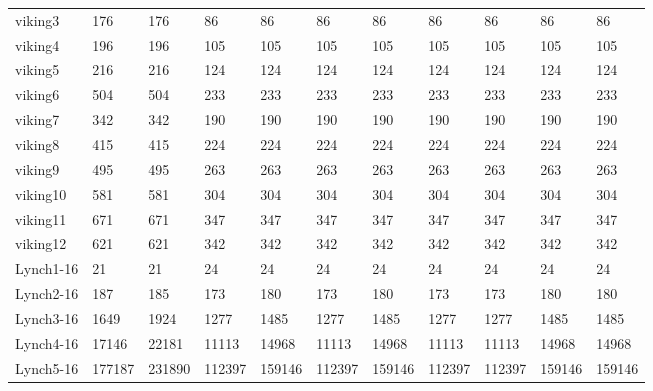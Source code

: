 \begin{table}
\begin{adjustbox}{max totalheight=\textheight}
\begin{tabular}{|l|llllllllll|}
    viking3            & 176      & 176      & 86       & 86       & 86       & 86       & 86       & 86       & 86       & 86       \\
    viking4            & 196      & 196      & 105      & 105      & 105      & 105      & 105      & 105      & 105      & 105      \\
    viking5            & 216      & 216      & 124      & 124      & 124      & 124      & 124      & 124      & 124      & 124      \\
    viking6            & 504      & 504      & 233      & 233      & 233      & 233      & 233      & 233      & 233      & 233      \\
    viking7            & 342      & 342      & 190      & 190      & 190      & 190      & 190      & 190      & 190      & 190      \\
    viking8            & 415      & 415      & 224      & 224      & 224      & 224      & 224      & 224      & 224      & 224      \\
    viking9            & 495      & 495      & 263      & 263      & 263      & 263      & 263      & 263      & 263      & 263      \\
    viking10           & 581      & 581      & 304      & 304      & 304      & 304      & 304      & 304      & 304      & 304      \\
    viking11           & 671      & 671      & 347      & 347      & 347      & 347      & 347      & 347      & 347      & 347      \\
    viking12           & 621      & 621      & 342      & 342      & 342      & 342      & 342      & 342      & 342      & 342      \\ \hline
    Lynch1-16          & 21       & 21       & 24       & 24       & 24       & 24       & 24       & 24       & 24       & 24       \\
    Lynch2-16          & 187      & 185      & 173      & 180      & 173      & 180      & 173      & 173      & 180      & 180      \\
    Lynch3-16          & 1649     & 1924     & 1277     & 1485     & 1277     & 1485     & 1277     & 1277     & 1485     & 1485     \\
    Lynch4-16          & 17146    & 22181    & 11113    & 14968    & 11113    & 14968    & 11113    & 11113    & 14968    & 14968    \\
    Lynch5-16          & 177187   & 231890   & 112397   & 159146   & 112397   & 159146   & 112397   & 112397   & 159146   & 159146   \\ \hline

\end{tabular}
\end{adjustbox}
\end{table}

